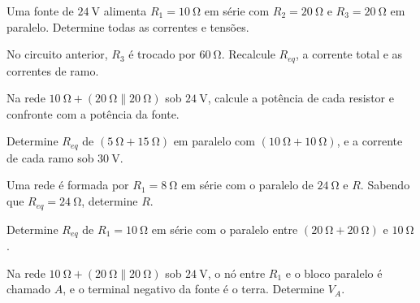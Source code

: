 \blocoaplicacao
\begin{questao}[2]{}

Uma fonte de $\SI{24}{\volt}$ alimenta $R_1=\SI{10}{\ohm}$ em série com
$R_2=\SI{20}{\ohm}$ e $R_3=\SI{20}{\ohm}$ em paralelo. Determine todas as
correntes e tensões.


\end{questao}
\begin{questao}[2]{}

No circuito anterior, $R_3$ é trocado por $\SI{60}{\ohm}$. Recalcule
$R_{eq}$, a corrente total e as correntes de ramo.


\end{questao}
\begin{questao}[2]{}

Na rede $\SI{10}{\ohm}+(\SI{20}{\ohm}\parallel\SI{20}{\ohm})$ sob
$\SI{24}{\volt}$, calcule a potência de cada resistor e confronte com a
potência da fonte.


\end{questao}
\begin{questao}[2]{}

Determine $R_{eq}$ de $(\SI{5}{\ohm}+\SI{15}{\ohm})$ em paralelo com
$(\SI{10}{\ohm}+\SI{10}{\ohm})$, e a corrente de cada ramo sob
$\SI{30}{\volt}$.


\end{questao}
\begin{questao}[2]{}

Uma rede é formada por $R_1=\SI{8}{\ohm}$ em série com o paralelo de
$\SI{24}{\ohm}$ e $R$. Sabendo que $R_{eq}=\SI{24}{\ohm}$, determine $R$.


\end{questao}
\begin{questao}[2]{}

Determine $R_{eq}$ de $R_1=\SI{10}{\ohm}$ em série com o paralelo entre
$(\SI{20}{\ohm}+\SI{20}{\ohm})$ e $\SI{10}{\ohm}$.


\end{questao}
\begin{questao}[2]{}

Na rede $\SI{10}{\ohm}+(\SI{20}{\ohm}\parallel\SI{20}{\ohm})$ sob
$\SI{24}{\volt}$, o nó entre $R_1$ e o bloco paralelo é chamado $A$, e o
terminal negativo da fonte é o terra. Determine $V_A$.


\end{questao}
